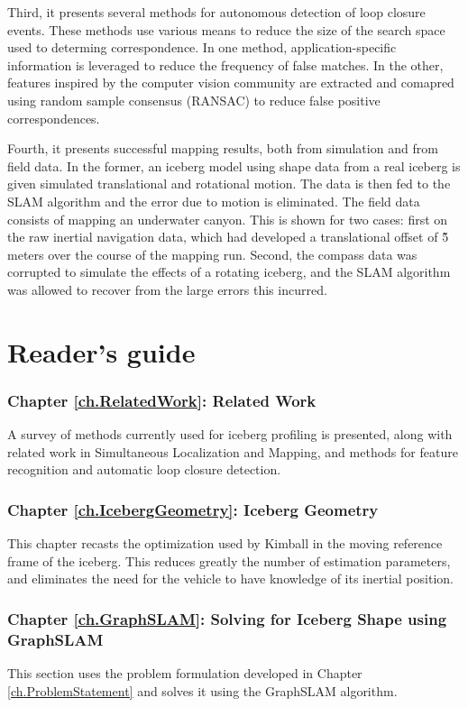 Third, it presents several methods for autonomous detection of loop closure events. These methods use various means to reduce the size of the search space used to determing correspondence. In one method, application-specific information is leveraged to reduce the frequency of false matches. In the other, features inspired by the computer vision community are extracted and comapred using random sample consensus (RANSAC) to reduce  false positive correspondences.

Fourth, it presents successful mapping results, both from simulation and from field data. In the former, an iceberg model using shape data from a real iceberg is given simulated translational and rotational motion. The data is then fed to the SLAM algorithm and the error due to motion is eliminated. The field data consists of mapping an underwater canyon. This is shown for two cases: first on the raw inertial navigation data, which had developed a translational offset of \~5 meters over the course of the mapping run. Second, the compass data was corrupted to simulate the effects of a rotating iceberg, and the SLAM algorithm was allowed to recover from the large errors this incurred.

\section{Reader's guide}

\subsubsection*{Chapter \ref{ch.RelatedWork}: Related Work} A survey of methods currently used for iceberg profiling is presented, along with related work in Simultaneous Localization and Mapping, and methods for feature recognition and automatic loop closure detection.

\subsubsection*{Chapter \ref{ch.IcebergGeometry}: Iceberg Geometry}  This chapter recasts the optimization used by Kimball \cite{} in the moving reference frame of the iceberg. This reduces greatly the number of estimation parameters, and eliminates the need for the vehicle to have knowledge of its inertial position.

\subsubsection*{Chapter \ref{ch.GraphSLAM}: Solving for Iceberg Shape using GraphSLAM} This section uses the problem formulation developed in Chapter \ref{ch.ProblemStatement} and solves it using the GraphSLAM algorithm.

